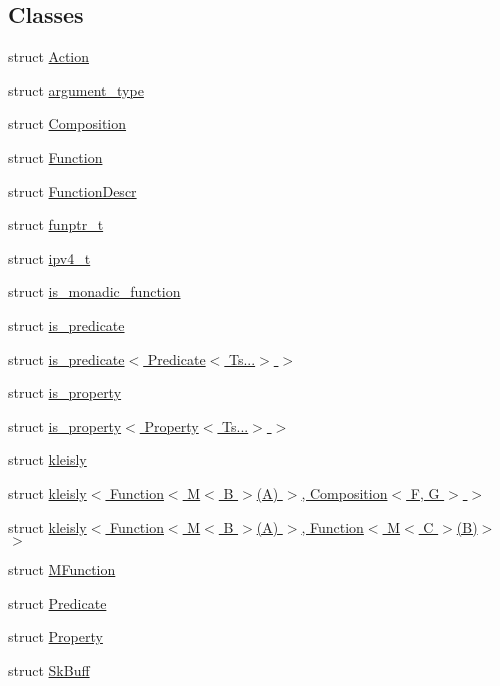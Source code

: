 \subsection*{Classes}
\begin{DoxyCompactItemize}
\item 
struct \hyperlink{structpfq_1_1lang_1_1Action}{Action}
\item 
struct \hyperlink{structpfq_1_1lang_1_1argument__type}{argument\+\_\+type}
\item 
struct \hyperlink{structpfq_1_1lang_1_1Composition}{Composition}
\item 
struct \hyperlink{structpfq_1_1lang_1_1Function}{Function}
\item 
struct \hyperlink{structpfq_1_1lang_1_1FunctionDescr}{Function\+Descr}
\item 
struct \hyperlink{structpfq_1_1lang_1_1funptr__t}{funptr\+\_\+t}
\item 
struct \hyperlink{structpfq_1_1lang_1_1ipv4__t}{ipv4\+\_\+t}
\item 
struct \hyperlink{structpfq_1_1lang_1_1is__monadic__function}{is\+\_\+monadic\+\_\+function}
\item 
struct \hyperlink{structpfq_1_1lang_1_1is__predicate}{is\+\_\+predicate}
\item 
struct \hyperlink{structpfq_1_1lang_1_1is__predicate_3_01Predicate_3_01Ts_8_8_8_4_01_4}{is\+\_\+predicate$<$ Predicate$<$ Ts...$>$ $>$}
\item 
struct \hyperlink{structpfq_1_1lang_1_1is__property}{is\+\_\+property}
\item 
struct \hyperlink{structpfq_1_1lang_1_1is__property_3_01Property_3_01Ts_8_8_8_4_01_4}{is\+\_\+property$<$ Property$<$ Ts...$>$ $>$}
\item 
struct \hyperlink{structpfq_1_1lang_1_1kleisly}{kleisly}
\item 
struct \hyperlink{structpfq_1_1lang_1_1kleisly_3_01Function_3_01M_3_01B_01_4_07A_08_01_4_00_01Composition_3_01F_00_01G_01_4_01_4}{kleisly$<$ Function$<$ M$<$ B $>$(\+A) $>$, Composition$<$ F, G $>$ $>$}
\item 
struct \hyperlink{structpfq_1_1lang_1_1kleisly_3_01Function_3_01M_3_01B_01_4_07A_08_01_4_00_01Function_3_01M_3_01C_01_4_07B_08_4_01_4}{kleisly$<$ Function$<$ M$<$ B $>$(\+A) $>$, Function$<$ M$<$ C $>$(\+B)$>$ $>$}
\item 
struct \hyperlink{structpfq_1_1lang_1_1MFunction}{M\+Function}
\item 
struct \hyperlink{structpfq_1_1lang_1_1Predicate}{Predicate}
\item 
struct \hyperlink{structpfq_1_1lang_1_1Property}{Property}
\item 
struct \hyperlink{structpfq_1_1lang_1_1SkBuff}{Sk\+Buff}
\end{DoxyCompactItemize}
